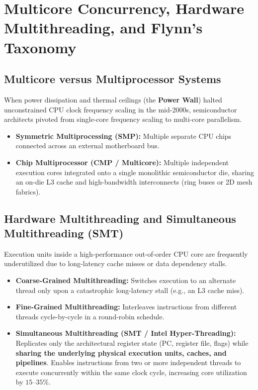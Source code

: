 \section{Multicore Concurrency, Hardware Multithreading, and Flynn's Taxonomy}
\label{sec:multicore_parallelism}

\subsection{Multicore versus Multiprocessor Systems}
When power dissipation and thermal ceilings (the \textbf{Power Wall}) halted unconstrained CPU clock frequency scaling in the mid-2000s, semiconductor architects pivoted from single-core frequency scaling to multi-core parallelism.
\begin{itemize}
    \item \textbf{Symmetric Multiprocessing (SMP):} Multiple separate CPU chips connected across an external motherboard bus.
    \item \textbf{Chip Multiprocessor (CMP / Multicore):} Multiple independent execution cores integrated onto a single monolithic semiconductor die, sharing an on-die L3 cache and high-bandwidth interconnects (ring buses or 2D mesh fabrics).
\end{itemize}

\subsection{Hardware Multithreading and Simultaneous Multithreading (SMT)}
Execution units inside a high-performance out-of-order CPU core are frequently underutilized due to long-latency cache misses or data dependency stalls.
\begin{itemize}
    \item \textbf{Coarse-Grained Multithreading:} Switches execution to an alternate thread only upon a catastrophic long-latency stall (e.g., an L3 cache miss).
    \item \textbf{Fine-Grained Multithreading:} Interleaves instructions from different threads cycle-by-cycle in a round-robin schedule.
    \item \textbf{Simultaneous Multithreading (SMT / Intel Hyper-Threading):} Replicates only the architectural register state (PC, register file, flags) while \textbf{sharing the underlying physical execution units, caches, and pipelines}. Enables instructions from two or more independent threads to execute concurrently within the same clock cycle, increasing core utilization by $15$--$35\%$.
\end{itemize}

